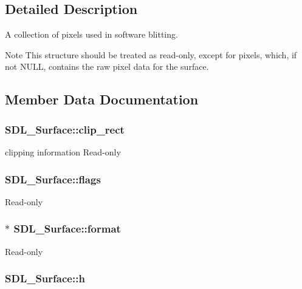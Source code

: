 \subsection{Detailed Description}
A collection of pixels used in software blitting. 

\begin{DoxyNote}{Note}
This structure should be treated as read-\/only, except for {\ttfamily pixels}, which, if not N\-U\-L\-L, contains the raw pixel data for the surface. 
\end{DoxyNote}


\subsection{Member Data Documentation}
\hypertarget{struct_s_d_l___surface_aa9a0da3b38261dad6cf0cc4e3bb5b0c3}{
\subsubsection[{clip\-\_\-rect}]{ S\-D\-L\-\_\-\-Surface\-::clip\-\_\-rect}}\label{struct_s_d_l___surface_aa9a0da3b38261dad6cf0cc4e3bb5b0c3}
clipping information Read-\/only \hypertarget{struct_s_d_l___surface_a86d78b665d5dfd7aa1dd9696b067641b}{
\subsubsection[{flags}]{ S\-D\-L\-\_\-\-Surface\-::flags}}\label{struct_s_d_l___surface_a86d78b665d5dfd7aa1dd9696b067641b}
Read-\/only \hypertarget{struct_s_d_l___surface_a0a90721f947c10c3b79e02ccb419ca62}{
\subsubsection[{format}]{$\ast$ S\-D\-L\-\_\-\-Surface\-::format}}\label{struct_s_d_l___surface_a0a90721f947c10c3b79e02ccb419ca62}
Read-\/only \hypertarget{struct_s_d_l___surface_af33bcf87a1f5e10a99b3c7e8626b38c8}{
\subsubsection[{h}]{ S\-D\-L\-\_\-\-Surface\-::h}}\label{struct_s_d_l___surface_af33bcf87a1f5e10a99b3c7e8626b38c8}
